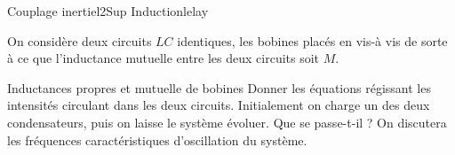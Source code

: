 \begin{exercise}{Couplage inertiel}{2}{Sup}
{Induction}{lelay}

On considère deux circuits $LC$ identiques, les bobines placés en vis-à vis de sorte à ce que l'inductance mutuelle entre les deux circuits soit $M$.

\begin{questions}
    \questioncours Inductances propres et mutuelle de bobines
    \question Donner les équations régissant les intensités circulant dans les deux circuits.
    \question Initialement on charge un des deux condensateurs, puis on laisse le système évoluer. Que se passe-t-il ? On discutera les fréquences caractéristiques d'oscillation du système.
\end{questions}

\end{exercise}
